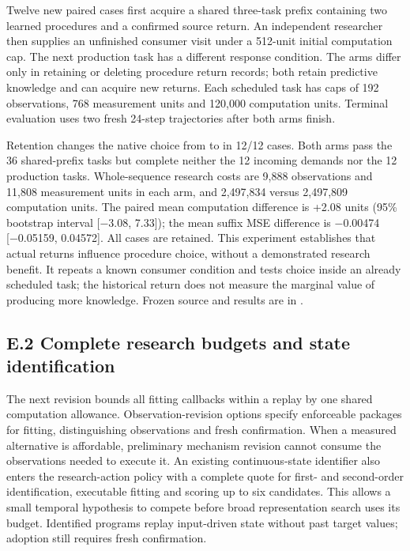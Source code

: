 \documentclass[11pt,a4paper]{article}
\begin{document}
Twelve new paired cases first acquire a shared three-task prefix containing two
learned procedures and a confirmed source return. An independent researcher then
supplies an unfinished consumer visit under a 512-unit initial computation cap.
The next production task has a different response condition. The arms differ
only in retaining or deleting procedure return records; both retain predictive
knowledge and can acquire new returns. Each scheduled task has caps of 192
observations, 768 measurement units and 120,000 computation units. Terminal
evaluation uses two fresh 24-step trajectories after both arms finish.


Retention changes the native choice from  to  in 12/12 cases.
Both arms pass the 36 shared-prefix tasks but complete neither the 12 incoming
demands nor the 12 production tasks. Whole-sequence research costs are 9,888
observations and 11,808 measurement units in each arm, and 2,497,834 versus
2,497,809 computation units. The paired mean computation difference is +2.08
units (95\% bootstrap interval [−3.08, 7.33]); the mean suffix MSE difference is
−0.00474 [−0.05159, 0.04572]. All cases are retained. This experiment establishes
that actual returns influence procedure choice, without a demonstrated research
benefit. It repeats a known consumer condition and tests choice inside an already
scheduled task; the historical return does not measure the marginal value of
producing more knowledge. Frozen source and results are in
.


\subsection*{E.2 Complete research budgets and state identification}

The next revision bounds all fitting callbacks within a replay by one shared
computation allowance. Observation-revision options specify enforceable packages
for fitting, distinguishing observations and fresh confirmation. When a measured
alternative is affordable, preliminary mechanism revision cannot consume the
observations needed to execute it. An existing continuous-state identifier also
enters the research-action policy with a complete quote for first- and second-order
identification, executable fitting and scoring up to six candidates. This allows
a small temporal hypothesis to compete before broad representation search uses
its budget. Identified programs replay input-driven state without past target
values; adoption still requires fresh confirmation.
\end{document}

